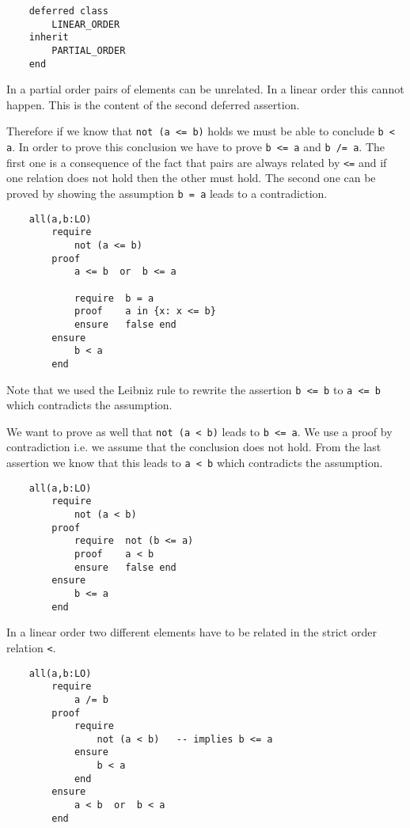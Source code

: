 \begin{lstlisting}
    deferred class
        LINEAR_ORDER
    inherit
        PARTIAL_ORDER
    end
\end{lstlisting}

In a partial order pairs of elements can be unrelated. In a linear order this
cannot happen. This is the content of the second deferred assertion.

Therefore if we know that \lstinline!not (a <= b)! holds we must be able to
conclude \lstinline!b < a!. In order to prove this conclusion we have to prove
\lstinline!b <= a! and \lstinline!b /= a!. The first one is a consequence of
the fact that pairs are always related by \lstinline!<=! and if one relation
does not hold then the other must hold. The second one can be proved by
showing the assumption \lstinline!b = a! leads to a contradiction.

\begin{lstlisting}
    all(a,b:LO)
        require
            not (a <= b)
        proof
            a <= b  or  b <= a

            require  b = a
            proof    a in {x: x <= b}
            ensure   false end
        ensure
            b < a
        end
\end{lstlisting}
%
Note that we used the Leibniz rule to rewrite the assertion \lstinline!b <= b!
to \lstinline!a <= b! which contradicts the assumption.

We want to prove as well that \lstinline!not (a < b)!  leads to
\lstinline!b <= a!. We use a proof by contradiction i.e. we assume that the
conclusion does not hold. From the last assertion we know that this leads to
\lstinline!a < b!  which contradicts the assumption.

\begin{lstlisting}
    all(a,b:LO)
        require
            not (a < b)
        proof
            require  not (b <= a)
            proof    a < b
            ensure   false end
        ensure
            b <= a
        end
\end{lstlisting}

In a linear order two different elements have to be related in the strict order
relation \lstinline!<!.

\begin{lstlisting}
    all(a,b:LO)
        require
            a /= b
        proof
            require
                not (a < b)   -- implies b <= a
            ensure
                b < a
            end
        ensure
            a < b  or  b < a
        end
\end{lstlisting}

